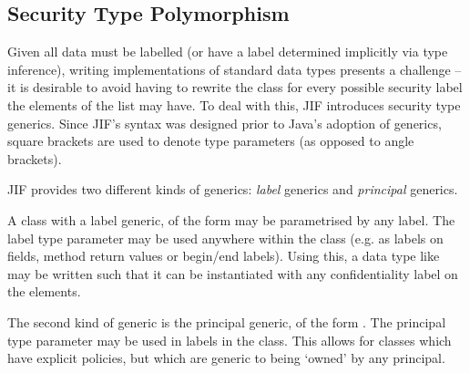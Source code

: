 \subsection{Security Type Polymorphism}

Given all data must be labelled (or have a label determined implicitly via type inference), writing implementations of standard data types presents a challenge -- it is desirable to avoid having to rewrite the  class for every possible security label the elements of the list may have. To deal with this, JIF introduces security type generics. Since JIF's syntax was designed prior to Java's adoption of generics, square brackets are used to denote type parameters (as opposed to angle brackets).

JIF provides two different kinds of generics: \textit{label} generics and \textit{principal} generics.

A class with a label generic, of the form  may be parametrised by any label. The label type parameter may be used anywhere within the class (e.g. as labels on fields, method return values or begin/end labels). Using this, a data type like  may be written such that it can be instantiated with any confidentiality label on the elements.

The second kind of generic is the principal generic, of the form . The principal type parameter may be used in labels in the class. This allows for classes which have explicit policies, but which are generic to being `owned' by any principal.

